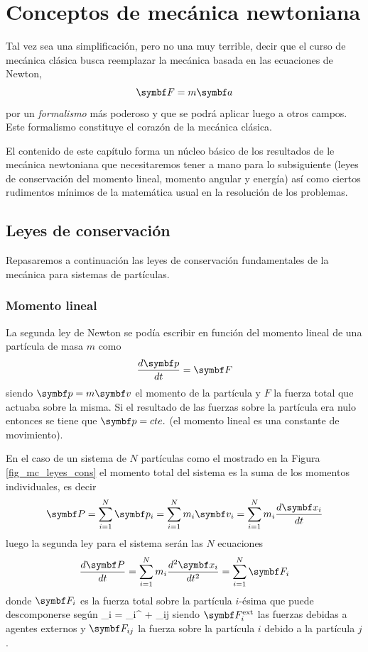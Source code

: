 \documentclass[10pt,oneside]{CBFT_book}
\begin{document}
\chapter{Conceptos de mecánica newtoniana}

Tal vez sea una simplificación, pero no una muy terrible, decir que el curso de mecánica clásica
busca reemplazar la mecánica basada en las ecuaciones de Newton,
\[
	\vb{F} = m \vb{a} 
\]
por un \emph{formalismo} más poderoso y que se podrá aplicar luego a otros campos.
Este formalismo constituye el corazón de la mecánica clásica.

El contenido de este capítulo forma un núcleo básico de los resultados de le mecánica newtoniana que necesitaremos 
tener a mano para lo subsiguiente (leyes de conservación del momento lineal, momento angular y energía) así como 
ciertos rudimentos mínimos de la matemática usual en la resolución de los problemas.

\section{Leyes de conservación}

Repasaremos a continuación las leyes de conservación fundamentales de la mecánica para sistemas de partículas.

\subsection{Momento lineal}

La segunda ley de Newton se podía escribir en función del momento lineal de una partícula de masa $ m $ como
\[
	\dtot{\vb{p}}{t} = \vb{F}
\]
siendo $ \vb{p} = m\vb{v} $ el momento de la partícula y $ F $ la fuerza total que actuaba sobre la misma.
Si el resultado de las fuerzas sobre la partícula era nulo entonces se tiene que $ \vb{p} = cte. $ (el momento lineal 
es una constante de movimiento).

En el caso de un sistema de $N$ partículas como el mostrado en la Figura \ref{fig_mc_leyes_cons} el momento total del 
sistema es la suma de los momentos individuales, es decir
\[
	\vb{P} = \Sum{i=1}{N} \vb{p}_i = \Sum{i=1}{N} m_i \vb{v}_i = \Sum{i=1}{N} m_i \dtot{\vb{x}_i}{t}
\]
luego la segunda ley para el sistema serán las $ N $ ecuaciones
\[
	\dtot{\vb{P}}{t} = \Sum{i=1}{N} m_i \dtot[2]{\vb{x}_i}{t} = \Sum{i=1}{N} \vb{F}_i
\]
donde $ \vb{F}_i$ es la fuerza total sobre la partícula $i$-ésima que puede descomponerse según
\be
	_i = _i^ +  _{ij}
	\label{descomp_fuerzas}
\ee
siendo $ \vb{F}_i^\text{ext} $ las fuerzas debidas a agentes externos y $\vb{F}_{ij}$ la fuerza sobre la partícula $i$ 
debido a la partícula $j$.
\end{document}
